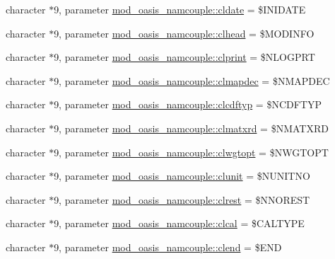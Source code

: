 \begin{DoxyCompactItemize}
\item 
character $\ast$9, parameter \hyperlink{namespacemod__oasis__namcouple_a0f2d8d935f9088aec74c4dda3e9f5d9c}{mod\+\_\+oasis\+\_\+namcouple\+::cldate} = \textquotesingle{}\$I\+N\+I\+D\+A\+TE \textquotesingle{}
\item 
character $\ast$9, parameter \hyperlink{namespacemod__oasis__namcouple_a15338be5483b1b392e3e5580be75704d}{mod\+\_\+oasis\+\_\+namcouple\+::clhead} = \textquotesingle{}\$M\+O\+D\+I\+N\+FO \textquotesingle{}
\item 
character $\ast$9, parameter \hyperlink{namespacemod__oasis__namcouple_aeaab03598b6067fbecd8d8fc0c54443e}{mod\+\_\+oasis\+\_\+namcouple\+::clprint} = \textquotesingle{}\$N\+L\+O\+G\+P\+RT \textquotesingle{}
\item 
character $\ast$9, parameter \hyperlink{namespacemod__oasis__namcouple_acb6d787969090bd3c10b20775abf6531}{mod\+\_\+oasis\+\_\+namcouple\+::clmapdec} = \textquotesingle{}\$N\+M\+A\+P\+D\+EC \textquotesingle{}
\item 
character $\ast$9, parameter \hyperlink{namespacemod__oasis__namcouple_a501b430490bf3e519a11641a00f2e855}{mod\+\_\+oasis\+\_\+namcouple\+::clcdftyp} = \textquotesingle{}\$N\+C\+D\+F\+T\+YP \textquotesingle{}
\item 
character $\ast$9, parameter \hyperlink{namespacemod__oasis__namcouple_ab529642a54ad832b85c11fe4bd843314}{mod\+\_\+oasis\+\_\+namcouple\+::clmatxrd} = \textquotesingle{}\$N\+M\+A\+T\+X\+RD \textquotesingle{}
\item 
character $\ast$9, parameter \hyperlink{namespacemod__oasis__namcouple_a5ddab80f5f002c5cee81e3bbcfcda6be}{mod\+\_\+oasis\+\_\+namcouple\+::clwgtopt} = \textquotesingle{}\$N\+W\+G\+T\+O\+PT \textquotesingle{}
\item 
character $\ast$9, parameter \hyperlink{namespacemod__oasis__namcouple_a003e41234b67967593d94b3dca1a69c3}{mod\+\_\+oasis\+\_\+namcouple\+::clunit} = \textquotesingle{}\$N\+U\+N\+I\+T\+NO \textquotesingle{}
\item 
character $\ast$9, parameter \hyperlink{namespacemod__oasis__namcouple_a283471addd7aefe719c8eb6bc45072b0}{mod\+\_\+oasis\+\_\+namcouple\+::clrest} = \textquotesingle{}\$N\+N\+O\+R\+E\+ST \textquotesingle{}
\item 
character $\ast$9, parameter \hyperlink{namespacemod__oasis__namcouple_ad027273d67834ba44518cd9825f933b8}{mod\+\_\+oasis\+\_\+namcouple\+::clcal} = \textquotesingle{}\$C\+A\+L\+T\+Y\+PE \textquotesingle{}
\item 
character $\ast$9, parameter \hyperlink{namespacemod__oasis__namcouple_a52b0d4b9289219603308d3cb3fcc9eac}{mod\+\_\+oasis\+\_\+namcouple\+::clend} = \textquotesingle{}\$E\+ND \textquotesingle{}

\end{DoxyCompactItemize}
